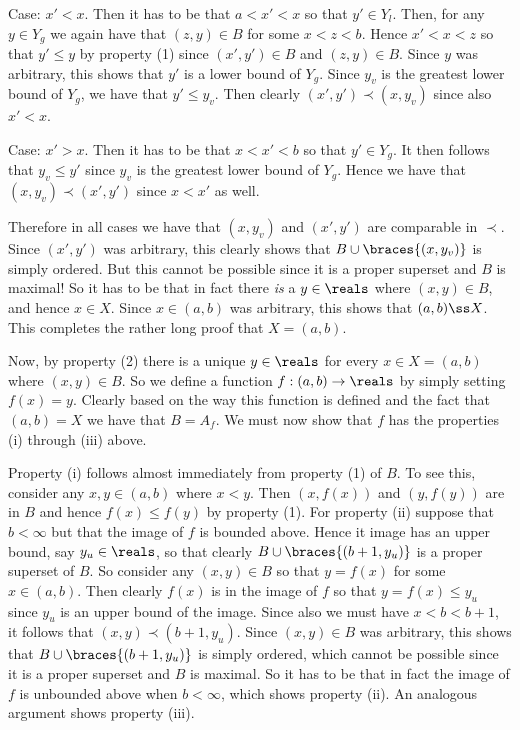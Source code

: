 {{    Case: $x' < x$.
    Then it has to be that $a < x' < x$ so that $y' \in Y_l$.
    Then, for any $y \in Y_g$ we again have that $(z,y) \in B$ for some $x < z < b$.
    Hence $x' < x < z$ so that $y' \leq y$ by property (1) since $(x',y') \in B$ and $(z,y) \in B$.
    Since $y$ was arbitrary, this shows that $y'$ is a lower bound of $Y_g$.
    Since $y_v$ is the greatest lower bound of $Y_g$, we have that $y' \leq y_v$.
    Then clearly $(x',y') \prec (x, y_v)$ since also $x' < x$.

    Case: $x' > x$.
    Then it has to be that $x < x' < b$ so that $y' \in Y_g$.
    It then follows that $y_v \leq y'$ since $y_v$ is the greatest lower bound of $Y_g$.
    Hence we have that $(x,y_v) \prec (x',y')$  since $x < x'$ as well.

    Therefore in all cases we have that $(x,y_v)$ and $(x',y')$ are comparable in $\prec$.
    Since $(x',y')$ was arbitrary, this clearly shows that $B \cup \braces{(x,y_v)}$ is simply ordered.
    But this cannot be possible since it is a proper superset and $B$ is maximal!
    So it has to be that in fact there \emph{is} a $y \in \reals$ where $(x,y) \in B$, and hence $x \in X$.
    Since $x \in (a,b)$ was arbitrary, this shows that $(a,b) \ss X$.
    This completes the rather long proof that $X = (a,b)$.

    Now, by property (2) there is a unique $y \in \reals$ for every $x \in X = (a,b)$ where $(x,y) \in B$.
    So we define a function $f: (a,b) \to \reals$ by simply setting $f(x) = y$.
    Clearly based on the way this function is defined and the fact that $(a,b) = X$ we have that $B = A_f$.
    We must now show that $f$ has the properties (i) through (iii) above.

    Property (i) follows almost immediately from property (1) of $B$.
    To see this, consider any $x,y \in (a,b)$ where $x < y$.
    Then $(x,f(x))$ and $(y,f(y))$ are in $B$ and hence $f(x) \leq f(y)$ by property (1).
    For property (ii) suppose that $b < \infty$ but that the image of $f$ is bounded above.
    Hence it image has an upper bound, say $y_u \in \reals$, so that clearly $B \cup \braces{(b+1,y_u)}$ is a proper superset of $B$.
    So consider any $(x,y) \in B$ so that $y = f(x)$ for some $x \in (a,b)$.
    Then clearly $f(x)$ is in the image of $f$ so that $y = f(x) \leq y_u$ since $y_u$ is an upper bound of the image.
    Since also we must have $x < b < b+1$, it follows that $(x,y) \prec (b+1, y_u)$.
    Since $(x,y) \in B$ was arbitrary, this shows that $B \cup \braces{(b+1,y_u)}$ is simply ordered, which cannot be possible since it is a proper superset and $B$ is maximal.
    So it has to be that in fact the image of $f$ is unbounded above when $b < \infty$, which shows property (ii).
    An analogous argument shows property (iii).

}}
